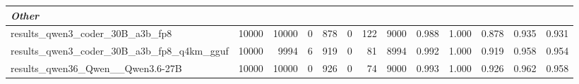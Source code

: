 \begin{table}[htbp]
{\begin{tabular}{lrrrrrrrrrrrr}
    \midrule
    \multicolumn{13}{l}{\textit{Other}} \\
    \midrule
    results\_qwen3\_coder\_30B\_a3b\_fp8 & 10000 & 10000 & 0 & 878 & 0 & 122 & 9000 & 0.988 & 1.000 & 0.878 & 0.935 & 0.931 \\
    results\_qwen3\_coder\_30B\_a3b\_fp8\_q4km\_gguf & 10000 & 9994 & 6 & 919 & 0 & 81 & 8994 & 0.992 & 1.000 & 0.919 & 0.958 & 0.954 \\
    results\_qwen36\_Qwen\_\_Qwen3.6-27B & 10000 & 10000 & 0 & 926 & 0 & 74 & 9000 & 0.993 & 1.000 & 0.926 & 0.962 & 0.958 \\
    \bottomrule
  \end{tabular}
  }
\end{table}

